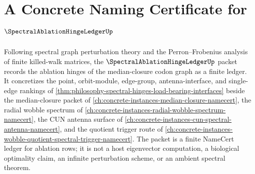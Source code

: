 \chapter{A Concrete Naming Certificate for $\SpectralAblationHingeLedgerUp$}
\label{ch:concrete-instances-spectral-ablation-hinge-ledger-namecert}

Following spectral graph perturbation theory and the Perron--Frobenius analysis of finite killed-walk matrices, the $\SpectralAblationHingeLedgerUp$ packet records the ablation hinges of the median-closure codon graph as a finite ledger. It concretizes the point, orbit-module, edge-group, antenna-interface, and single-edge rankings of \autoref{thm:philosophy-spectral-hinges-load-bearing-interfaces} beside the median-closure packet of \autoref{ch:concrete-instances-median-closure-namecert}, the radial wobble spectrum of \autoref{ch:concrete-instances-radial-wobble-spectrum-namecert}, the CUN antenna surface of \autoref{ch:concrete-instances-cun-spectral-antenna-namecert}, and the quotient trigger route of \autoref{ch:concrete-instances-wobble-quotient-spectral-trigger-namecert}. The packet is a finite NameCert ledger for ablation rows; it is not a host eigenvector computation, a biological optimality claim, an infinite perturbation scheme, or an ambient spectral theorem.



